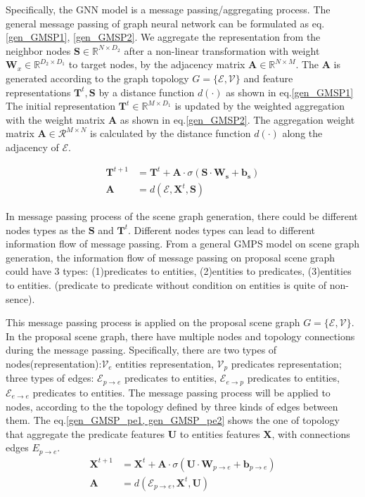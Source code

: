 Specifically, the GNN model is a message passing/aggregating process.
The general message passing of graph neural network can be formulated as eq.\ref{gen_GMSP1}, \ref{gen_GMSP2}. We aggregate the representation from the neighbor nodes $\mathbf{S} \in \mathbb{R}^{N \times D_2}$ after a non-linear transformation with weight $\mathbf{W}_x \in \mathbb{R}^{D_2 \times D_1}$ to target nodes, by the adjacency matrix $\mathbf{A} \in \mathbb{R}^{N \times M}$.
The $\mathbf{A}$ is generated according to the graph topology $G=\{\mathcal{E}, \mathcal{V}\}$ and feature representations $\mathbf{T}^{t}, \mathbf{S}$ by a distance function $d(\cdot)$ as shown in eq.\ref{gen_GMSP1}
The initial representation $\mathbf{T}^{t} \in \mathbb{R}^{M \times D_1}$ is updated by the weighted aggregation with the weight matrix $\mathbf{A}$ as shown in eq.\ref{gen_GMSP2}.
The aggregation weight matrix $\mathbf{A} \in \mathcal{R}^{M \times N}$ is calculated by the distance function $d(\cdot)$ along the adjacency of $\mathcal{E}$. 

\begin{align}
    \mathbf{T}^{t+1} &= \mathbf{T}^{t} + \mathbf{A} \cdot \sigma (\mathbf{S} \cdot  \mathbf{W_s}  + \mathbf{b_s}) \label{gen_GMSP1} \\
    \mathbf{A} &= d(\mathcal{E}, \mathbf{X}^{t}, \mathbf{S}) \label{gen_GMSP2}
\end{align}

In message passing process of the scene graph generation, there could be different nodes types as the $\mathbf{S}$ and $\mathbf{T}^{t}$. Different nodes types can lead to different information flow of message passing.
From a general GMPS model on scene graph generation, the information flow of message passing on proposal scene graph could have 3 types: (1)predicates to entities, (2)entities to predicates, (3)entities to entities. (predicate to predicate without condition on entities is quite of non-sence). 

This message passing process is applied on the proposal scene graph $G=\{\mathcal{E}, \mathcal{V}\}$. 
In the proposal scene graph, there have multiple nodes and topology connections during the message passing. 
Specifically, there are two types of nodes(representation):$\mathcal{V}_e$ entities representation, $\mathcal{V}_p$ predicates representation; three types of edges: $\mathcal{E}_{p\rightarrow e}$ predicates to entities, $\mathcal{E}_{e\rightarrow p}$ predicates to entities, $\mathcal{E}_{e\rightarrow e}$ predicates to entities.
The message passing process will be applied to nodes, according to the the topology defined by three kinds of edges between them. The eq.\ref{gen_GMSP_pe1, gen_GMSP_pe2} shows the one of topology that aggregate the predicate features $\mathbf{U}$ to entities features $\mathbf{X}$, with connections edges $E_{p\rightarrow e}$.
\begin{align}
    \mathbf{X}^{t+1} &= \mathbf{X}^{t} + \mathbf{A} \cdot \sigma (\mathbf{U} \cdot  \mathbf{W}_{p\rightarrow e}  + \mathbf{b}_{p\rightarrow e}) \label{gen_GMSP_pe1} \\
    \mathbf{A} &= d(\mathcal{E}_{p\rightarrow e}, \mathbf{X}^{t}, \mathbf{U})
\label{gen_GMSP_pe2}
\end{align}

